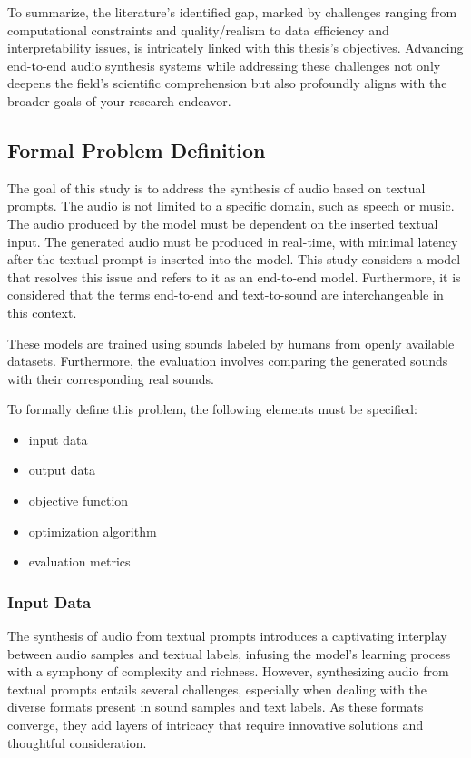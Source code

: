 To summarize, the literature's identified gap, marked by challenges ranging from computational constraints and quality/realism to data efficiency and interpretability issues, is intricately linked with this thesis's objectives. Advancing end-to-end audio synthesis systems while addressing these challenges not only deepens the field's scientific comprehension but also profoundly aligns with the broader goals of your research endeavor.

\subsection{Formal Problem Definition}

The goal of this study is to address the synthesis of audio based on textual prompts. The audio is not limited to a specific domain, such as speech or music. The audio produced by the model must be dependent on the inserted textual input. The generated audio must be produced in real-time, with minimal latency after the textual prompt is inserted into the model. This study considers a model that resolves this issue and refers to it as an end-to-end model. Furthermore, it is considered that the terms end-to-end and text-to-sound are interchangeable in this context.

These models are trained using sounds labeled by humans from openly available datasets. Furthermore, the evaluation involves comparing the generated sounds with their corresponding real sounds.

To formally define this problem, the following elements must be specified:

\begin{itemize}
    \item input data
    \item output data
    \item objective function
    \item optimization algorithm
    \item evaluation metrics
\end{itemize}

\subsubsection{Input Data}

The synthesis of audio from textual prompts introduces a captivating interplay between audio samples and textual labels, infusing the model's learning process with a symphony of complexity and richness. However, synthesizing audio from textual prompts entails several challenges, especially when dealing with the diverse formats present in sound samples and text labels. As these formats converge, they add layers of intricacy that require innovative solutions and thoughtful consideration.


